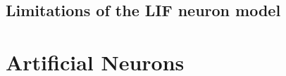\documentclass[10pt,letterpaper,oneside]{article}
\begin{document}
\subsection{Limitations of the LIF neuron model}

\section{Artificial Neurons}




\end{document}
